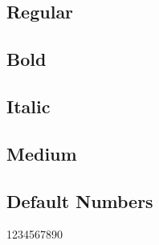 \documentclass{article}
\begin{document}
\subsection*{Regular}
\lipsum[1]


\subsection*{Bold}

\textbf{\lipsum[2]}

\subsection*{Italic}

\textit{\lipsum[3]}
\subsection*{Medium}
{\selectfont\lipsum[5]}






\subsection*{Default Numbers}

1234567890
\end{document}
